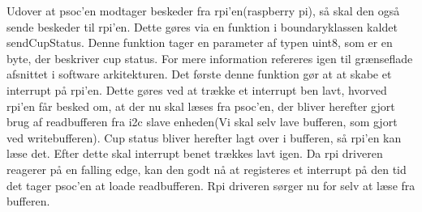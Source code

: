 \documentclass[Softwaredesign/Softwaredesign_main.tex]{subfiles}
\begin{document}
Udover at psoc'en modtager beskeder fra rpi'en(raspberry pi), så skal den også sende beskeder til rpi'en. Dette gøres  via en funktion i boundaryklassen kaldet sendCupStatus. Denne funktion tager en parameter af typen uint8, som er en byte, der beskriver cup status. For mere information refereres igen til grænseflade afsnittet i software arkitekturen. Det første denne funktion gør at at skabe et interrupt på rpi'en. Dette gøres ved at trække et interrupt ben lavt, hvorved rpi'en får besked om, at der nu skal læses fra psoc'en, der bliver herefter gjort brug af readbufferen fra i2c slave enheden(Vi skal selv lave bufferen, som gjort ved writebufferen). Cup status bliver herefter lagt over i bufferen, så rpi'en kan læse det. Efter dette skal interrupt benet trækkes lavt igen. Da rpi driveren reagerer på en falling edge, kan den godt nå at registeres et interrupt på den tid det tager psoc'en at loade readbufferen. Rpi driveren sørger nu for selv at læse fra bufferen. 
\end{document}

